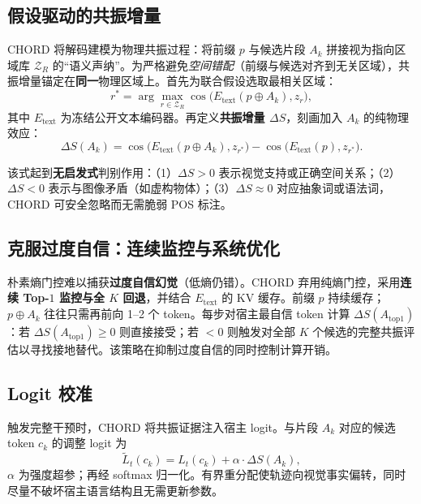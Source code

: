 \subsection{假设驱动的共振增量}

CHORD 将解码建模为物理共振过程：将前缀 $p$ 与候选片段 $A_k$ 拼接视为指向区域库 $\mathcal{Z}_R$ 的``语义声纳''。为严格避免\emph{空间错配}（前缀与候选对齐到无关区域），共振增量锚定在\textbf{同一}物理区域上。首先为联合假设选取最相关区域：
\begin{equation}
  r^* = \arg\max_{r \in \mathcal{Z}_R} \cos\bigl(E_{\text{text}}(p \oplus A_k), z_r\bigr),
\end{equation}
其中 $E_{\text{text}}$ 为冻结公开文本编码器。再定义\textbf{共振增量 $\Delta S$}，刻画加入 $A_k$ 的纯物理效应：
\begin{equation}
  \Delta S(A_k) = \cos\bigl(E_{\text{text}}(p \oplus A_k), z_{r^*}\bigr) - \cos\bigl(E_{\text{text}}(p), z_{r^*}\bigr).
\end{equation}

该式起到\textbf{无启发式}判别作用：（1）$\Delta S>0$ 表示视觉支持或正确空间关系；（2）$\Delta S<0$ 表示与图像矛盾（如虚构物体）；（3）$\Delta S\approx 0$ 对应抽象词或语法词，CHORD 可安全忽略而无需脆弱 POS 标注。

\subsection{克服过度自信：连续监控与系统优化}

朴素熵门控难以捕获\textbf{过度自信幻觉}（低熵仍错）。CHORD 弃用纯熵门控，采用\textbf{连续 Top-$1$ 监控与全 $K$ 回退}，并结合 $E_{\text{text}}$ 的 KV 缓存。前缀 $p$ 持续缓存；$p\oplus A_k$ 往往只需再前向 1--2 个 token。每步对宿主最自信 token 计算 $\Delta S(A_{\text{top1}})$：若 $\Delta S(A_{\text{top1}})\ge 0$ 则直接接受；若 $<0$ 则触发对全部 $K$ 个候选的完整共振评估以寻找接地替代。该策略在抑制过度自信的同时控制计算开销。

\subsection{Logit 校准}

触发完整干预时，CHORD 将共振证据注入宿主 logit。与片段 $A_k$ 对应的候选 token $c_k$ 的调整 logit 为
\begin{equation}
  \tilde{L}_t(c_k) = L_t(c_k) + \alpha \cdot \Delta S(A_k),
\end{equation}
$\alpha$ 为强度超参；再经 softmax 归一化。有界重分配使轨迹向视觉事实偏转，同时尽量不破坏宿主语言结构且无需更新参数。
